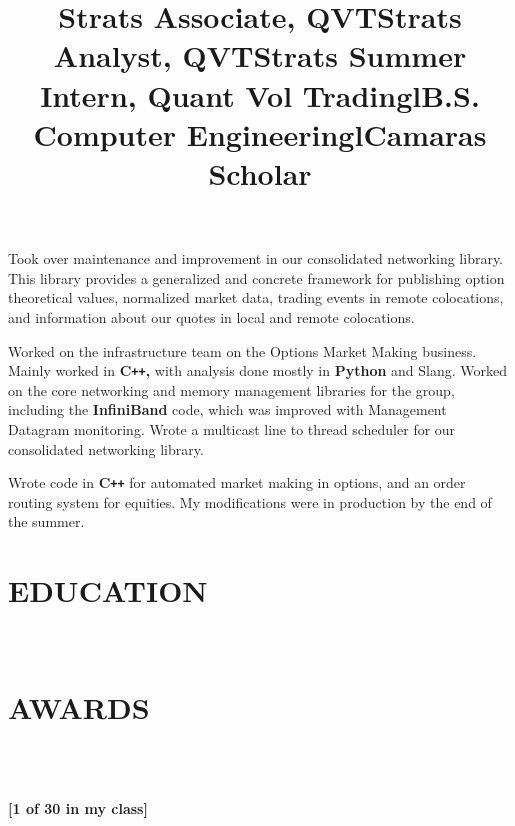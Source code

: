 \documentclass{res}
\begin{document}
\begin{resume}
\title{\bf Strats Associate, QVT}
\begin{position}
     Took over maintenance and improvement in our consolidated networking library. This library provides a generalized and concrete framework for publishing option theoretical values, normalized market data, trading events in remote colocations, and information about our quotes in local and remote colocations.
\end{position}

\title{\bf Strats Analyst, QVT}
\begin{position}
	Worked on the infrastructure team on the Options Market Making business. Mainly worked in {\bf C\texttt{++}, } with analysis done mostly in {\bf Python }and Slang.
	Worked on the core networking and memory management libraries for the group, including the {\bf InfiniBand} code, which was improved with Management Datagram monitoring. Wrote a multicast line to thread scheduler for our consolidated networking library.
\end{position}

\title{\bf Strats Summer Intern, Quant Vol Trading}
\begin{position}
     Wrote code in {\bf C\texttt{++}} for automated market making in options, and an order routing system for equities. My modifications were in production by the end of the summer.
\end{position}

\section{EDUCATION}

\begin{format}
  \title{l}  \\
\end{format}
\title{B.S. Computer Engineering}
\begin{position}
\end{position}

\section{AWARDS}
\begin{format}
  \title{l} \\
  \body\\
\end{format}
\title{\bf Camaras Scholar}
\dates{}
\begin{position}
        {\bf [1 of 30 in my class]}
\end{position}


\end{resume}
\end{document}
